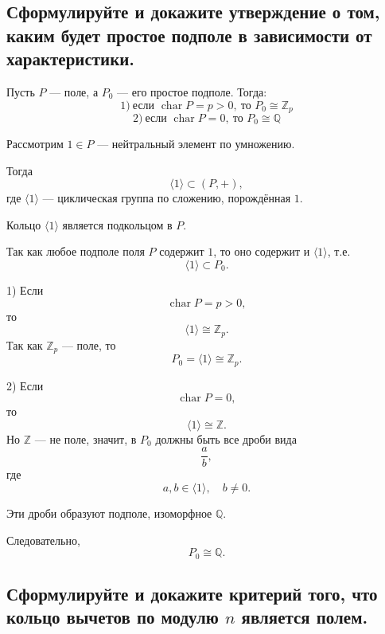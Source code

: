 \subsection{Сформулируйте и докажите утверждение о том, каким будет простое подполе в зависимости от характеристики.}

\begin{theorem}
    Пусть $P$ --- поле, а $P_0$ --- его простое подполе. Тогда:
    \[
        1)\ \text{если } \operatorname{char} P = p > 0,\ \text{то } P_0 \cong \mathbb{Z}_p
    \]
    \[
        2)\ \text{если } \operatorname{char} P = 0,\ \text{то } P_0 \cong \mathbb{Q}
    \]
\end{theorem}

\begin{Proof}
    Рассмотрим $1 \in P$ --- нейтральный элемент по умножению.
    
    Тогда
    \[
        \langle 1 \rangle \subset (P,+),
    \]
    где $\langle 1 \rangle$ --- циклическая группа по сложению, порождённая $1$.
    
    Кольцо $\langle 1 \rangle$ является подкольцом в $P$.
    
    Так как любое подполе поля $P$ содержит $1$, то оно содержит и $\langle 1 \rangle$, т.е.
    \[
        \langle 1 \rangle \subset P_0.
    \]
    
    \bigskip
    
    1) Если
    \[
        \operatorname{char} P = p > 0,
    \]
    то
    \[
        \langle 1 \rangle \cong \mathbb{Z}_p.
    \]
    Так как $\mathbb{Z}_p$ --- поле, то
    \[
        P_0 = \langle 1 \rangle \cong \mathbb{Z}_p.
    \]
    
    \bigskip
    
    2) Если
    \[
        \operatorname{char} P = 0,
    \]
    то
    \[
        \langle 1 \rangle \cong \mathbb{Z}.
    \]
    Но $\mathbb{Z}$ --- не поле, значит, в $P_0$ должны быть все дроби вида
    \[
        \frac{a}{b},
    \]
    где
    \[
        a,b \in \langle 1 \rangle,\quad b \neq 0.
    \]
    
    Эти дроби образуют подполе, изоморфное $\mathbb{Q}$.
    
    Следовательно,
    \[
        P_0 \cong \mathbb{Q}.
    \]
\end{Proof}

\subsection{Сформулируйте и докажите критерий того, что кольцо вычетов по модулю $n$ является полем.}

